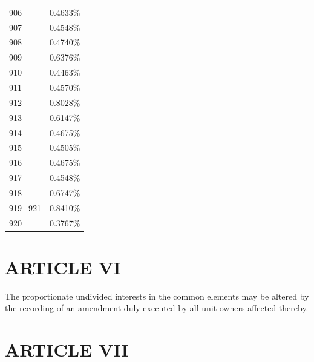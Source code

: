 \documentclass[
  14pt,
]{book}
\begin{document}
\begin{longtable}[]{@{}ll@{}}
906 & 0.4633\% \\
907 & 0.4548\% \\
908 & 0.4740\% \\
909 & 0.6376\% \\
910 & 0.4463\% \\
911 & 0.4570\% \\
912 & 0.8028\% \\
913 & 0.6147\% \\
914 & 0.4675\% \\
915 & 0.4505\% \\
916 & 0.4675\% \\
917 & 0.4548\% \\
918 & 0.6747\% \\
919+921 & 0.8410\% \\
920 & 0.3767\% \\
\bottomrule
\end{longtable}

\hypertarget{article-vi}{%
\section*{ARTICLE VI}\label{article-vi}}

The proportionate undivided interests in the common elements may be altered by the recording of an amendment duly executed by all unit owners affected thereby.

\hypertarget{article-vii}{%
\section*{ARTICLE VII}\label{article-vii}}
\end{document}
